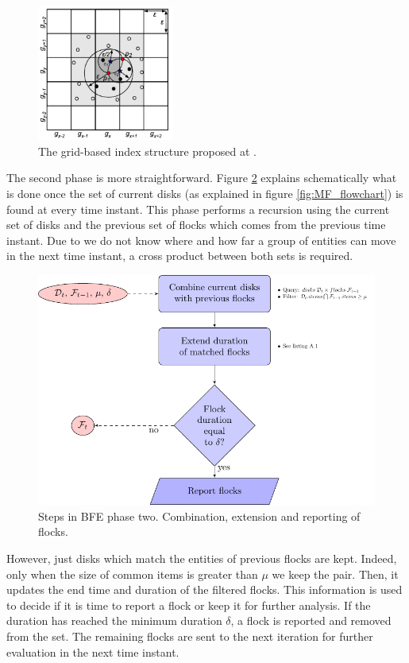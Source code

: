 \begin{figure}
    \centering
    \includegraphics[width=0.4\textwidth]{figures/grid2}
    \caption{The grid-based index structure proposed at \cite{vieira_2009}.}\label{fig:grid}
\end{figure}

The second phase is more straightforward.  Figure \ref{fig:FF_flowchart} explains schematically what is done once the set of current disks (as explained in figure \ref{fig:MF_flowchart}) is found at every time instant.  This phase performs a recursion using the current set of disks and the previous set of flocks which comes from the  previous time instant.  Due to we do not know where and how far a group of entities can move in the next time instant, a cross product between both sets is required.  

\begin{figure}
    \centering
    \includegraphics[width=\linewidth]{figures/FF_flowchart}
    \caption{Steps in BFE phase two. Combination, extension and reporting of flocks.}\label{fig:FF_flowchart}
\end{figure}

However, just disks which match the entities of previous flocks are kept.  Indeed, only when the size of common items is greater than $\mu$ we keep the pair.  Then, it updates the end time and duration of the filtered flocks.  This information is used to decide if it is time to report a flock or keep it for further analysis.  If the duration has reached the minimum duration $\delta$, a flock is reported and removed from the set.  The remaining flocks are sent to the next iteration for further evaluation in the next time instant.


